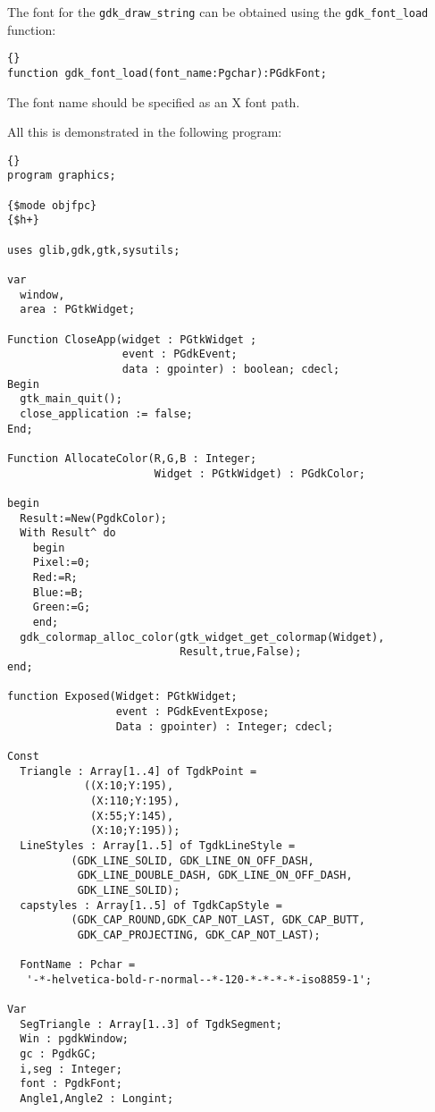 \documentclass[10pt]{article}
\newcommand{\var}[1]{\texttt{#1}}
\begin{document}
The font for the \var{gdk\_draw\_string} can be obtained using the
\var{gdk\_font\_load} function:
\begin{lstlisting}{}
function gdk_font_load(font_name:Pgchar):PGdkFont;
\end{lstlisting}{}
The font name should be specified as an X font path.

All this is demonstrated in the following program:
\begin{lstlisting}{}
program graphics;

{$mode objfpc}
{$h+}

uses glib,gdk,gtk,sysutils;

var 
  window, 
  area : PGtkWidget;

Function CloseApp(widget : PGtkWidget ;
                  event : PGdkEvent;
                  data : gpointer) : boolean; cdecl;
Begin
  gtk_main_quit();
  close_application := false;
End;

Function AllocateColor(R,G,B : Integer; 
                       Widget : PGtkWidget) : PGdkColor;

begin
  Result:=New(PgdkColor);
  With Result^ do
    begin
    Pixel:=0;
    Red:=R;
    Blue:=B;
    Green:=G;  
    end;
  gdk_colormap_alloc_color(gtk_widget_get_colormap(Widget),
                           Result,true,False);
end;

function Exposed(Widget: PGtkWidget;
                 event : PGdkEventExpose; 
                 Data : gpointer) : Integer; cdecl;

Const 
  Triangle : Array[1..4] of TgdkPoint = 
            ((X:10;Y:195),
             (X:110;Y:195),
             (X:55;Y:145),
             (X:10;Y:195));
  LineStyles : Array[1..5] of TgdkLineStyle = 
          (GDK_LINE_SOLID, GDK_LINE_ON_OFF_DASH, 
           GDK_LINE_DOUBLE_DASH, GDK_LINE_ON_OFF_DASH, 
           GDK_LINE_SOLID);
  capstyles : Array[1..5] of TgdkCapStyle = 
          (GDK_CAP_ROUND,GDK_CAP_NOT_LAST, GDK_CAP_BUTT,  
           GDK_CAP_PROJECTING, GDK_CAP_NOT_LAST);

  FontName : Pchar = 
   '-*-helvetica-bold-r-normal--*-120-*-*-*-*-iso8859-1';
          
Var
  SegTriangle : Array[1..3] of TgdkSegment;
  Win : pgdkWindow;
  gc : PgdkGC;
  i,seg : Integer; 
  font : PgdkFont;
  Angle1,Angle2 : Longint;
    

\end{lstlisting}
\end{document}
